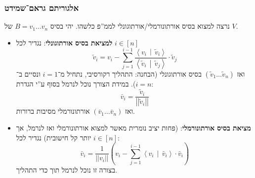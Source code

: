 \documentclass[a4paper]{article}
\newcommand\ra    {\rangle}
\newcommand\la    {\langle}
\newcommand\norm[1]   {\left \vert \left \vert #1 \right \vert \right \vert}
\newcommand\mut [2]   {\left \la #1 \,\middle|\, #2 \right \ra}
\newcommand\tl    {\tilde}
\newcommand\cl [1]    {\left ( #1 \right )}
\theoremstyle{definition}
\begin{document}
	\subsubsection{אלגוריתם גראם־שמידט}
	נרצה למצוא בסיס אורתונורמלי/אורתוגונלי לממ''פ כלשהו. יהי בסיס $B = v_1 \dots v_n$ של $V$. 
	\begin{itemize}
		\item \textbf{למציאת בסיס אורתוגונלי}: נגדיר לכל $i \in [n]$
		\[ \tl v_i = v_i - \sum_{j = 1}^{i - 1}\frac{\mut{v_i}{\tl v_i}}{\mut{\tl v_i}{\tl v_j}} \cdot \tl v_j \]
		ואז $(\tl v_1 \dots \tl v_n)$ בסיס אורתוגונלי (הבחנה: התהליך רקורסיבי, נתחיל מ־$i = 1$ ונסיים ב־$i = n$). במידת הצורך נוכל לנרמל בסוף ע''י הגדרת: 
		\[ \bar v_i = \frac{\tl v_i}{\norm{\tl v_i}} \]
		ואז $(\bar v_1 \dots \bar v_n)$ אורתונורמלי מסיבות ברורות. 
		\item \textbf{מציאת בסיס אורתונורמלי}: (פחות יציב נומרית מאשר למצוא אורתונורמלי ואז לנרמל, אך יותר קל חישובית) נגדיר לכל $i \in [n]$: 
		\[ \bar v_i = \frac{1}{\norm{v_i}} \cl{v_i - \sum_{j = 1}^{i - 1}\mut{v_i}{\bar v_i} \cdot \bar v_i} \]
		בצורה זו נוכל לנרמל תוך כדי התהליך. 
	\end{itemize}
\end{document}
